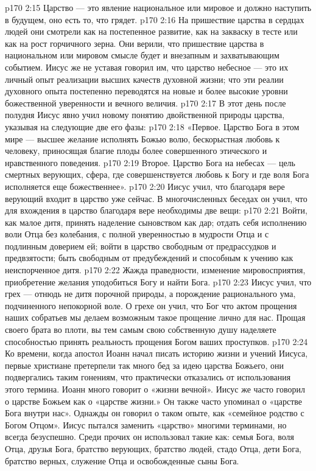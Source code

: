 \vs p170 2:15 \bibnobreakspace Царство --- это явление национальное или мировое и должно наступить в будущем, оно есть то, что грядет.
\vs p170 2:16 \pc На пришествие царства в сердцах людей они смотрели как на постепенное развитие, как на закваску в тесте или как на рост горчичного зерна. Они верили, что пришествие царства в национальном или мировом смысле будет и внезапным и захватывающим событием. Иисус же не уставая говорил им, что царство небесное --- это их личный опыт реализации высших качеств духовной жизни; что эти реалии духовного опыта постепенно переводятся на новые и более высокие уровни божественной уверенности и вечного величия.
\vs p170 2:17 В этот день после полудня Иисус явно учил новому понятию двойственной природы царства, указывая на следующие две его фазы:
\vs p170 2:18 «Первое. Царство Бога в этом мире --- высшее желание исполнять Божью волю, бескорыстная любовь к человеку, приносящая благие плоды более совершенного этического и нравственного поведения.
\vs p170 2:19 Второе. Царство Бога на небесах --- цель смертных верующих, сфера, где совершенствуется любовь к Богу и где воля Бога исполняется еще божественнее».
\vs p170 2:20 Иисус учил, что благодаря вере верующий входит в царство уже сейчас. В многочисленных беседах он учил, что для вхождения в царство благодаря вере необходимы две вещи:
\vs p170 2:21 \bibnobreakspace {} Войти, как малое дитя, принять наделение сыновством как дар; отдать себя исполнению воли Отца без колебания, с полной уверенностью в мудрости Отца и с подлинным доверием ей; войти в царство свободным от предрассудков и предвзятости; быть свободным от предубеждений и способным к учению как неиспорченное дитя.
\vs p170 2:22 \bibnobreakspace {} Жажда праведности, изменение мировосприятия, приобретение желания уподобиться Богу и найти Бога.
\vs p170 2:23 Иисус учил, что грех --- отнюдь не дитя порочной природы, а порождение рационального ума, подчиненного непокорной воле. О грехе он учил, что Бог  что актом прощения наших собратьев мы делаем возможным такое прощение лично для нас. Прощая своего брата во плоти, вы тем самым свою собственную душу наделяете способностью принять реальность прощения Богом ваших проступков.
\vs p170 2:24 Ко времени, когда апостол Иоанн начал писать историю жизни и учений Иисуса, первые христиане претерпели так много бед за идею царства Божьего, они подвергались таким гонениям, что практически отказались от использования этого термина. Иоанн много говорит о «жизни вечной». Иисус же часто говорил о царстве Божьем как о «царстве жизни.» Он также часто упоминал о «царстве Бога внутри нас». Однажды он говорил о таком опыте, как «семейное родство с Богом Отцом». Иисус пытался заменить «царство» многими терминами, но всегда безуспешно. Среди прочих он использовал такие как: семья Бога, воля Отца, друзья Бога, братство верующих, братство людей, стадо Отца, дети Бога, братство верных, служение Отца и освобожденные сыны Бога.
